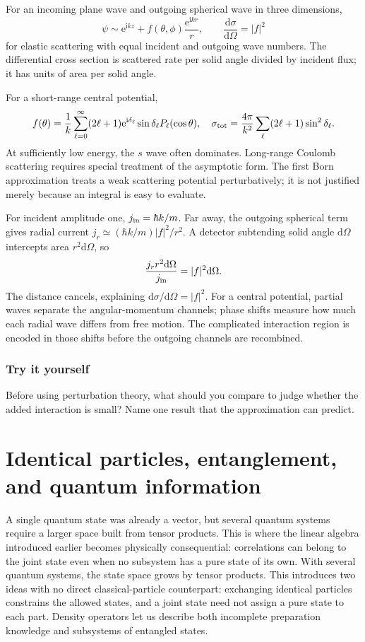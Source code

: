 \documentclass[11pt,oneside]{book}
\newcommand{\dd}{\mathrm{d}}
\newcommand{\ii}{\mathrm{i}}
\newcommand{\ee}{\mathrm{e}}
\newcommand{\od}[2]{\frac{\dd #1}{\dd #2}}
\theoremstyle{reviewstyle}
\newcommand{\learningcheck}[1]{\subsection*{Try it yourself}\noindent #1\par}
\begin{document}
For an incoming plane wave and outgoing spherical wave in three dimensions,
\begin{equation}\psi\sim\ee^{\ii kz}+f(\theta,\phi)\frac{\ee^{\ii kr}}r,\qquad \od{\sigma}{\Omega}=|f|^2\end{equation}
for elastic scattering with equal incident and outgoing wave numbers. The differential cross section is scattered rate per solid angle divided by incident flux; it has units of area per solid angle.

For a short-range central potential,
\begin{equation}f(\theta)=\frac1k\sum_{\ell=0}^\infty(2\ell+1)\ee^{\ii\delta_\ell}\sin\delta_\ell P_\ell(\cos\theta),\quad
\sigma_{\rm tot}=\frac{4\pi}{k^2}\sum_\ell(2\ell+1)\sin^2\delta_\ell.
\end{equation}
At sufficiently low energy, the $s$ wave often dominates. Long-range Coulomb scattering requires special treatment of the asymptotic form. The first Born approximation treats a weak scattering potential perturbatively; it is not justified merely because an integral is easy to evaluate.

For incident amplitude one, $j_{\rm in}=\hbar k/m$. Far away, the outgoing spherical term gives radial current $j_r\simeq(\hbar k/m)|f|^2/r^2$. A detector subtending solid angle $\dd\Omega$ intercepts area $r^2\dd\Omega$, so
\begin{equation}
\frac{j_r r^2\dd\Omega}{j_{\rm in}}=|f|^2\dd\Omega.
\end{equation}
The distance cancels, explaining $\dd\sigma/\dd\Omega=|f|^2$. For a central potential, partial waves separate the angular-momentum channels; phase shifts measure how much each radial wave differs from free motion. The complicated interaction region is encoded in those shifts before the outgoing channels are recombined.

\learningcheck{Before using perturbation theory, what should you compare to judge whether the added interaction is small? Name one result that the approximation can predict.}

\chapter{Identical particles, entanglement, and quantum information}
A single quantum state was already a vector, but several quantum systems require a larger space built from tensor products. This is where the linear algebra introduced earlier becomes physically consequential: correlations can belong to the joint state even when no subsystem has a pure state of its own.
With several quantum systems, the state space grows by tensor products. This introduces two ideas with no direct classical-particle counterpart: exchanging identical particles constrains the allowed states, and a joint state need not assign a pure state to each part. Density operators let us describe both incomplete preparation knowledge and subsystems of entangled states.
\end{document}
